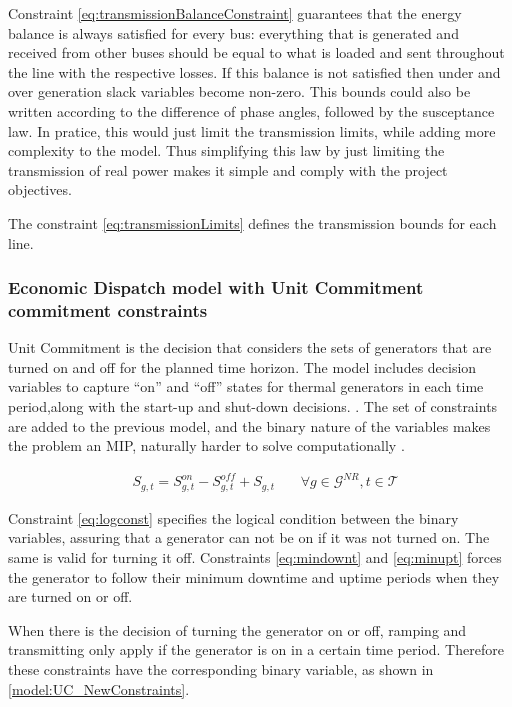 \documentclass[12pt,LUDisStyle,twosided]{book}
\newcommand{\mc}{\mathcal}
\begin{document}
Constraint \ref{eq:transmissionBalanceConstraint} guarantees that the energy balance is always satisfied for every bus: everything that is generated and received from other buses should be equal to what is loaded and sent throughout the line with the respective losses. If this balance is not satisfied then under and over generation slack variables become non-zero. This bounds could also be written according to the difference of phase angles, followed by the susceptance law. In pratice, this would just limit the transmission limits, while adding more complexity to the model. Thus simplifying this law by just limiting the transmission of real power makes it simple and comply with the project objectives.

The constraint \ref{eq:transmissionLimits} defines the transmission bounds for each line.

\subsubsection{Economic Dispatch model with Unit Commitment commitment constraints}
Unit Commitment is the decision that considers the sets of generators that are turned on and off for the planned time horizon. The model includes decision variables to capture ``on'' and ``off'' states for thermal generators in each time period,along with the start-up and shut-down decisions. \citep{palmintier}. The set of constraints are added to the previous model, and the binary nature of the variables makes the problem an MIP, naturally harder to solve computationally \cite{james}. 

\begin{subequations}\label{model:ucConstraints}
\begin{alignat}{4}
& S_{g,t} = S^{on}_{g,t} - S^{off}_{g,t} + S_{g,t}  &~& \forall g \in \mc{G}^{NR} , t \in \mc{T} \label{eq:logconst}\end{alignat} 
\end{subequations}

Constraint \ref{eq:logconst} specifies the logical condition between the binary variables, assuring that a generator can not be on if it was not turned on. The same is valid for turning it off. Constraints \ref{eq:mindownt} and \ref{eq:minupt} forces the generator to follow their minimum downtime and uptime periods when they are turned on or off. 

When there is the decision of turning the generator on or off, ramping and transmitting only apply if the generator is on in a certain time period. Therefore these constraints have the corresponding binary variable, as shown in \ref{model:UC_NewConstraints}. %
\end{document}
